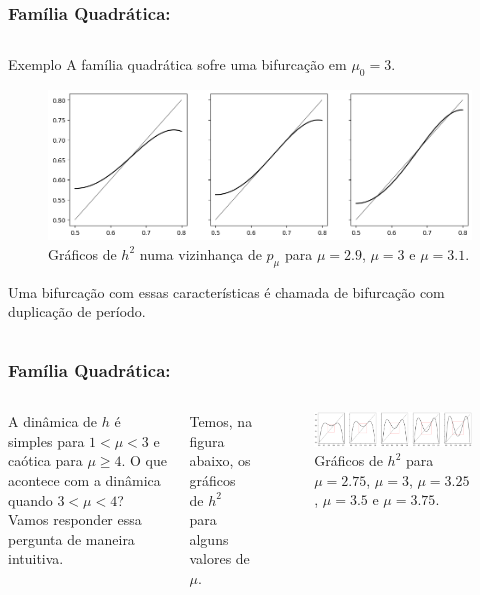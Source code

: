 
\begin{frame}
\vspace{5pt}
\frametitle{Família Quadrática: \subsecname}
\begin{columns}
\column{\dimexpr\paperwidth-15pt}

\begin{block}{Exemplo}
A família quadrática sofre uma bifurcação em $\mu_0 = 3$.

\vspace{10pt}

\begin{figure}[!htb]
\centering
\includegraphics[scale=0.4]{images/h_3^2.png}
\caption{Gráficos de $h^2$ numa vizinhança de $p_\mu$ para $\mu = 2.9$, $\mu = 3$ e $\mu = 3.1$.}
\end{figure}
Uma bifurcação com essas características é chamada de bifurcação com duplicação de período.
\end{block}

\end{columns}
\end{frame}


\begin{frame}
\vspace{5pt}
\frametitle{Família Quadrática: \subsecname}
\begin{columns}
\column{\dimexpr\paperwidth-15pt}

A dinâmica de $h$ é simples para $1 < \mu < 3$ e caótica para $\mu \geq 4$. O que acontece com a dinâmica quando $3 < \mu < 4$? Vamos responder essa pergunta de maneira intuitiva.

Temos, na figura abaixo, os gráficos de $h^2$ para alguns valores de $\mu$.

\begin{figure}[!htb]
\centering
\includegraphics[scale=0.375]{images/h^2withboxes.png}
\caption{Gráficos de $h^2$ para $\mu = 2.75$, $\mu = 3$, $\mu = 3.25$, $\mu = 3.5$ e $\mu = 3.75$.}
\label{h^2-and-boxes}
\end{figure}

\end{columns}
\end{frame}

